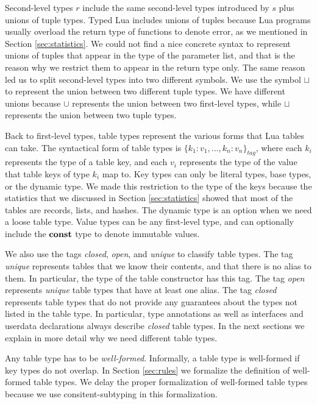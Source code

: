 Second-level types $r$ include the same second-level types introduced
by $s$ plus unions of tuple types.
Typed Lua includes unions of tuples because Lua programs
usually overload the return type of functions to denote error,
as we mentioned in Section \ref{sec:statistics}.
We could not find a nice concrete syntax to represent unions of
tuples that appear in the type of the parameter list, and
that is the reason why we restrict them to appear in the return type only.
The same reason led us to split second-level types into two
different symbols.
We use the symbol $\sqcup$ to represent the union between two
different tuple types.
We have different unions because $\cup$ represents the union
between two first-level types, while $\sqcup$ represents the
union between two tuple types.

Back to first-level types, table types represent the various forms
that Lua tables can take.
The syntactical form of table types is $\{ k_{1}{:}v_{1}, ..., k_{n}{:}v_{n} \}_{tag}$,
where each $k_{i}$ represents the type of a table key,
and each $v_{i}$ represents the type of the value that table keys of type $k_{i}$ map to.
Key types can only be literal types, base types, or the dynamic type.
We made this restriction to the type of the keys because the statistics
that we discussed in Section \ref{sec:statistics} showed that most
of the tables are records, lists, and hashes.
The dynamic type is an option when we need a loose table type.
Value types can be any first-level type, and can optionally include
the $\mathbf{const}$ type to denote immutable values.

We also use the tags \emph{closed}, \emph{open}, and \emph{unique}
to classify table types.
The tag \emph{unique} represents tables that we know their contents,
and that there is no alias to them.
In particular, the type of the table constructor has this tag.
The tag \emph{open} represents \emph{unique} table types that
have at least one alias.
The tag \emph{closed} represents table types that do not provide
any guarantees about the types not listed in the table type.
In particular, type annotations as well as interfaces and userdata
declarations always describe \emph{closed} table types.
In the next sections we explain in more detail why we need
different table types.

Any table type has to be \emph{well-formed}.
Informally, a table type is well-formed if key types do not overlap.
In Section \ref{sec:rules} we formalize the definition of well-formed table types.
We delay the proper formalization of well-formed table types because we use
consitent-subtyping in this formalization.


